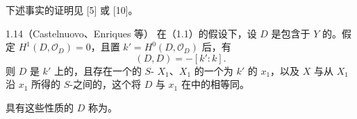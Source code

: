 下述事实的证明见 [5] 或 [10]。
\begin{SGAresult}{}{1.14（Castelnuovo、Enriques 等）}
在（1.1）的假设下，设 $D$ 是包含于 $Y$ 的。假定 $H^1(D,\mathcal O_D)=0$，且置 $k'=H^0(D,\mathcal O_D)$ 后，有
\[
(D,D)=-[k':k].
\]
则 $D$ 是 $k'$ 上的，且存在一个的 $S$- $X_1$、$X_1$ 的一个为 $k'$ 的 $x_1$，以及 $X$ 与从 $X_1$ 沿 $x_1$ 所得的 $S$-之间的，这个将 $D$ 与 $x_1$ 在中的相等同。
\end{SGAresult}
具有这些性质的 $D$ 称为。

